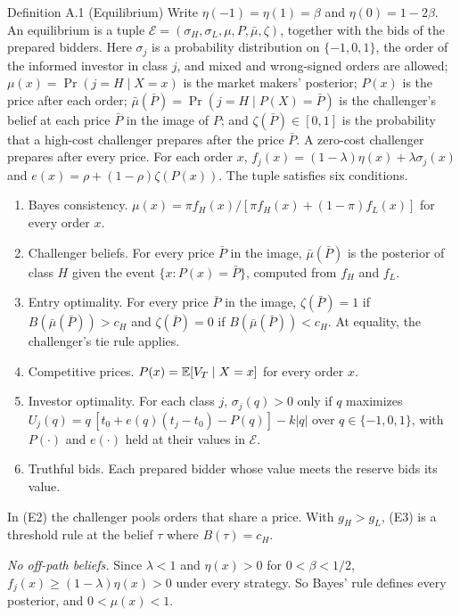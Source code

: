 \begin{paperresult}{Definition A.1 (Equilibrium)}
Write \(\eta(-1)=\eta(1)=\beta\) and \(\eta(0)=1-2\beta\).
An equilibrium is a tuple \(\mathcal{E}=(\sigma_H,\sigma_L,\mu,P,\bar\mu,\zeta)\), together with the bids of the prepared bidders.
Here \(\sigma_j\) is a probability distribution on \(\{-1,0,1\}\), the order of the informed investor in class \(j\), and mixed and wrong-signed orders are allowed;
\(\mu(x)=\Pr(j=H\mid X=x)\) is the market makers' posterior;
\(P(x)\) is the price after each order;
\(\bar\mu(\bar P)=\Pr(j=H\mid P(X)=\bar P)\) is the challenger's belief at each price \(\bar P\) in the image of \(P\);
and \(\zeta(\bar P)\in[0,1]\) is the probability that a high-cost challenger prepares after the price \(\bar P\).
A zero-cost challenger prepares after every price.
For each order \(x\), \(f_j(x)=(1-\lambda)\eta(x)+\lambda\sigma_j(x)\) and \(e(x)=\rho+(1-\rho)\zeta(P(x))\).
The tuple satisfies six conditions.
\begin{enumerate}[label=(E\arabic*),leftmargin=3em]
\item Bayes consistency. \(\mu(x)=\pi f_H(x)/[\pi f_H(x)+(1-\pi)f_L(x)]\) for every order \(x\).
\item Challenger beliefs. For every price \(\bar P\) in the image, \(\bar\mu(\bar P)\) is the posterior of class \(H\) given the event \(\{x:P(x)=\bar P\}\), computed from \(f_H\) and \(f_L\).
\item Entry optimality. For every price \(\bar P\) in the image, \(\zeta(\bar P)=1\) if \(B(\bar\mu(\bar P))>c_H\) and \(\zeta(\bar P)=0\) if \(B(\bar\mu(\bar P))<c_H\). At equality, the challenger's tie rule applies.
\item Competitive prices. \(P(x)=\mathbb{E}[V_T\mid X=x]\) for every order \(x\).
\item Investor optimality. For each class \(j\), \(\sigma_j(q)>0\) only if \(q\) maximizes \(U_j(q)=q\,[t_0+e(q)(t_j-t_0)-P(q)]-k|q|\) over \(q\in\{-1,0,1\}\), with \(P(\cdot)\) and \(e(\cdot)\) held at their values in \(\mathcal{E}\).
\item Truthful bids. Each prepared bidder whose value meets the reserve bids its value.
\end{enumerate}
\end{paperresult}

In (E2) the challenger pools orders that share a price. With \(g_H>g_L\), (E3) is a threshold rule at the belief \(\tau\) where \(B(\tau)=c_H\).

\emph{No off-path beliefs.} Since \(\lambda<1\) and \(\eta(x)>0\) for \(0<\beta<1/2\), \(f_j(x)\ge(1-\lambda)\eta(x)>0\) under every strategy. So Bayes' rule defines every posterior, and \(0<\mu(x)<1\).

